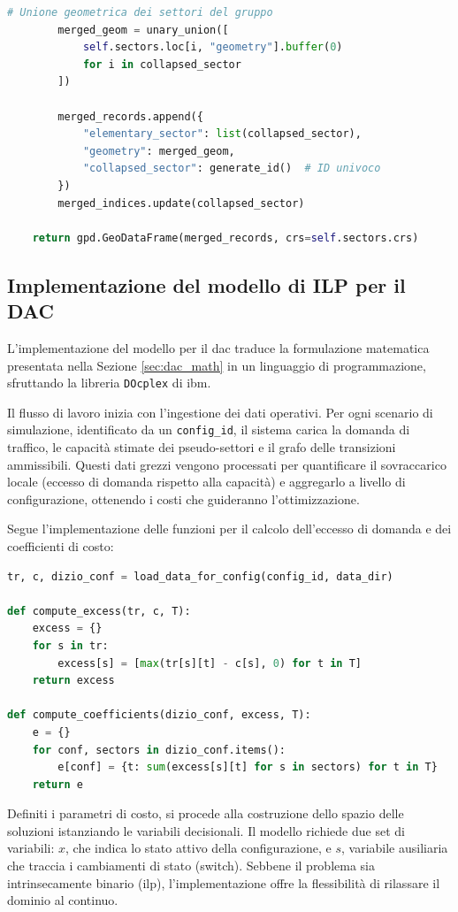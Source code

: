 \begin{lstlisting}[language=Python, caption={}]
        # Unione geometrica dei settori del gruppo
        merged_geom = unary_union([
            self.sectors.loc[i, "geometry"].buffer(0) 
            for i in collapsed_sector
        ])
        
        merged_records.append({
            "elementary_sector": list(collapsed_sector),
            "geometry": merged_geom,
            "collapsed_sector": generate_id()  # ID univoco
        })
        merged_indices.update(collapsed_sector)  
            
    return gpd.GeoDataFrame(merged_records, crs=self.sectors.crs)
\end{lstlisting}

\subsection{Implementazione del modello di ILP per il DAC}
L'implementazione del modello per il \gls{dac} traduce la formulazione matematica presentata nella Sezione \ref{sec:dac_math} in un linguaggio di programmazione, sfruttando la libreria \texttt{DOcplex} di \acrshort{ibm}. 

Il flusso di lavoro inizia con l'ingestione dei dati operativi. Per ogni scenario di simulazione, identificato da un \texttt{config\_id}, il sistema carica la domanda di traffico, le capacità stimate dei pseudo-settori e il grafo delle transizioni ammissibili. Questi dati grezzi vengono processati per quantificare il sovraccarico locale (eccesso di domanda rispetto alla capacità) e aggregarlo a livello di configurazione, ottenendo i costi che guideranno l'ottimizzazione.

Segue l'implementazione delle funzioni per il calcolo dell'eccesso di domanda e dei coefficienti di costo:
\clearpage
\begin{lstlisting}[language=Python, caption={}]
tr, c, dizio_conf = load_data_for_config(config_id, data_dir)

def compute_excess(tr, c, T):
    excess = {}
    for s in tr:
        excess[s] = [max(tr[s][t] - c[s], 0) for t in T]
    return excess

def compute_coefficients(dizio_conf, excess, T):
    e = {}
    for conf, sectors in dizio_conf.items():
        e[conf] = {t: sum(excess[s][t] for s in sectors) for t in T}
    return e
\end{lstlisting}

Definiti i parametri di costo, si procede alla costruzione dello spazio delle soluzioni istanziando le variabili decisionali. Il modello richiede due set di variabili: $x$, che indica lo stato attivo della configurazione, e $s$, variabile ausiliaria che traccia i cambiamenti di stato (switch). Sebbene il problema sia intrinsecamente binario (\gls{ilp}), l'implementazione offre la flessibilità di rilassare il dominio al continuo.

